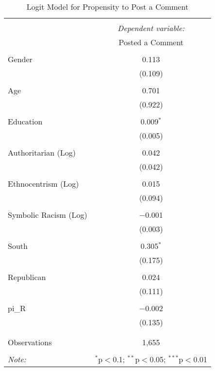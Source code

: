 
\begin{table}[H] \centering 
  \caption{Logit Model for Propensity to Post a Comment} 
  \label{} 
\begin{tabular}{@{\extracolsep{5pt}}lc} 
\\[-1.8ex]\hline 
\hline \\[-1.8ex] 
 & \multicolumn{1}{c}{\textit{Dependent variable:}} \\ 
\cline{2-2} 
 & Posted a Comment \\ 
\hline \\[-1.8ex] 
 Gender & 0.113 \\ 
  & (0.109) \\ 
  & \\ 
 Age & 0.701 \\ 
  & (0.922) \\ 
  & \\ 
 Education & 0.009$^{*}$ \\ 
  & (0.005) \\ 
  & \\ 
 Authoritarian (Log) & 0.042 \\ 
  & (0.042) \\ 
  & \\ 
 Ethnocentrism (Log) & 0.015 \\ 
  & (0.094) \\ 
  & \\ 
 Symbolic Racism (Log) & $-$0.001 \\ 
  & (0.003) \\ 
  & \\ 
 South & 0.305$^{*}$ \\ 
  & (0.175) \\ 
  & \\ 
 Republican & 0.024 \\ 
  & (0.111) \\ 
  & \\ 
 pi\_R & $-$0.002 \\ 
  & (0.135) \\ 
  & \\ 
\hline \\[-1.8ex] 
Observations & 1,655 \\ 
\hline 
\hline \\[-1.8ex] 
\textit{Note:}  & \multicolumn{1}{r}{$^{*}$p$<$0.1; $^{**}$p$<$0.05; $^{***}$p$<$0.01} \\ 
\end{tabular} 
\end{table} 
